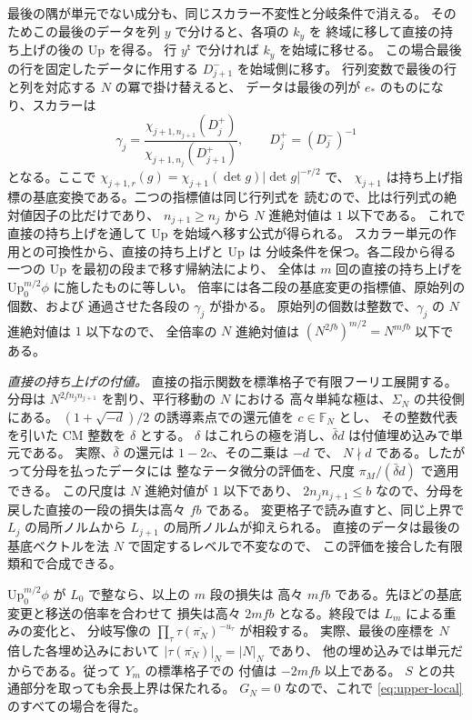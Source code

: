 最後の隅が単元でない成分も、同じスカラー不変性と分岐条件で消える。
そのためこの最後のデータを列 \(y\) で分けると、各項の \(k_y\) を
終域に移して直接の持ち上げの後の \(\mathrm{Up}\) を得る。
行 \(y^{\mathsf t}\) で分ければ \(k_y\) を始域に移せる。
この場合最後の行を固定したデータに作用する \(D_{j+1}^-\) を始域側に移す。
行列変数で最後の行と列を対応する \(N\) の冪で掛け替えると、
データは最後の列が \(e_*\) のものになり、スカラーは
\[
 \gamma_j
   =\frac{\chi_{j+1,n_{j+1}}(D_j^+)}
           {\chi_{j+1,n_j}(D_{j+1}^+)},\qquad D_j^+=(D_j^-)^{-1}
\]
となる。ここで \(\chi_{j+1,r}(g)=\chi_{j+1}(\det g)|\det g|^{-r/2}\) で、
\(\chi_{j+1}\) は持ち上げ指標の基底変換である。二つの指標値は同じ行列式を
読むので、比は行列式の絶対値因子の比だけであり、
\(n_{j+1}\ge n_j\) から \(N\) 進絶対値は \(1\) 以下である。
これで直接の持ち上げを通して \(\mathrm{Up}\) を始域へ移す公式が得られる。
スカラー単元の作用との可換性から、直接の持ち上げと \(\mathrm{Up}\) は
分岐条件を保つ。各二段から得る一つの \(\mathrm{Up}\) を最初の段まで移す帰納法により、
全体は \(m\) 回の直接の持ち上げを \(\mathrm{Up}_0^{m/2}\phi\) に施したものに等しい。
倍率には各二段の基底変更の指標値、原始列の個数、および
通過させた各段の \(\gamma_j\) が掛かる。
原始列の個数は整数で、\(\gamma_j\) の \(N\) 進絶対値は \(1\) 以下なので、
全倍率の \(N\) 進絶対値は \((N^{2fb})^{m/2}=N^{mfb}\) 以下である。

\emph{直接の持ち上げの付値。}
直接の指示関数を標準格子で有限フーリエ展開する。
分母は \(N^{2fn_jn_{j+1}}\) を割り、平行移動の \(N\) における
高々単純な極は、\(\Sigma_N\) の共役側にある。
\((1+\sqrt{-d})/2\) の誘導素点での還元値を \(c\in\mathbb F_N\) とし、
その整数代表を引いた CM 整数を \(\delta\) とする。
\(\delta\) はこれらの極を消し、\(\bar\delta d\) は付値埋め込みで単元である。
実際、\(\bar\delta\) の還元は \(1-2c\)、その二乗は \(-d\) で、
\(N\nmid d\) である。したがって分母を払ったデータには
整なテータ微分の評価を、尺度 \(\pi_M/(\bar\delta d)\) で適用できる。
この尺度は \(N\) 進絶対値が \(1\) 以下であり、
\(2n_jn_{j+1}\le b\) なので、分母を戻した直接の一段の損失は高々 \(fb\) である。
変更格子で読み直すと、同じ上界で \(L_j\) の局所ノルムから
\(L_{j+1}\) の局所ノルムが抑えられる。
直接のデータは最後の基底ベクトルを法 \(N\) で固定するレベルで不変なので、
この評価を接合した有限類和で合成できる。

\(\mathrm{Up}_0^{m/2}\phi\) が \(L_0\) で整なら、以上の \(m\) 段の損失は
高々 \(mfb\) である。先ほどの基底変更と移送の倍率を合わせて
損失は高々 \(2mfb\) となる。終段では \(L_m\) による重みの変化と、
分岐写像の \(\prod_\tau\tau(\overline{\pi_N})^{-u_\tau}\) が相殺する。
実際、最後の座標を \(N\) 倍した各埋め込みにおいて
\(\lvert\tau(\overline{\pi_N})\rvert_N=\lvert N\rvert_N\) であり、
他の埋め込みでは単元だからである。従って \(Y_m\) の標準格子での
付値は \(-2mfb\) 以上である。
\(S\) との共通部分を取っても余長上界は保たれる。
\(G_N=0\) なので、これで \eqref{eq:upper-local} のすべての場合を得た。

